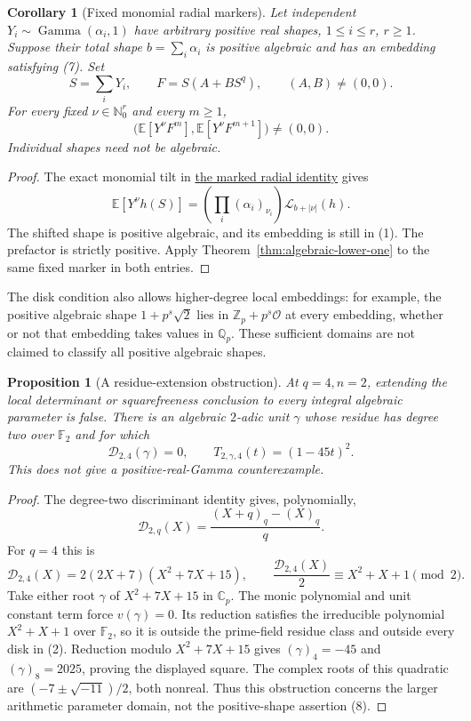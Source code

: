 \documentclass[11pt]{article}
\newtheorem{corollary}[lemma]{Corollary}
\newtheorem{proposition}[lemma]{Proposition}
\newcommand{\Cp}{\mathbb C_p}
\newcommand{\Zp}{\mathbb Z_p}
\newcommand{\OO}{\mathcal O}
\begin{document}
\begin{corollary}[Fixed monomial radial markers]\label{cor:algebraic-marked-radial}
Let independent $Y_i\sim\operatorname{Gamma}(\alpha_i,1)$ have
arbitrary positive real shapes, $1\le i\le r$, $r\ge1$.
Suppose their total shape $b=\sum_i\alpha_i$ is positive algebraic
and has an embedding satisfying (7).
Set
\[
 S=\sum_iY_i,\qquad F=S(A+BS^q),\qquad (A,B)\ne(0,0).
\]
For every fixed $\nu\in\mathbb N_0^r$ and every $m\ge1$,
\[
 \bigl(\mathbb E[Y^\nu F^m],\mathbb E[Y^\nu F^{m+1}]\bigr)\ne(0,0).
\]
Individual shapes need not be algebraic.
\end{corollary}
\begin{proof}
The exact monomial tilt in
\href{PRIME_POWER_MARKED_RADIAL_SFC.tex}{the marked radial identity}
gives
\[
 \mathbb E[Y^\nu h(S)]
  =\left(\prod_i(\alpha_i)_{\nu_i}\right)
           \mathcal L_{b+|\nu|}(h).
\]
The shifted shape is positive algebraic, and its embedding is still
in (1). The prefactor is strictly positive. Apply
Theorem~\ref{thm:algebraic-lower-one} to the same fixed marker in
both entries.
\end{proof}

The disk condition also allows higher-degree local embeddings:
for example, the positive algebraic shape $1+p^s\sqrt2$ lies in
$\Zp+p^s\OO$ at every embedding, whether or not that embedding
takes values in $\mathbb Q_p$. These sufficient domains are not
claimed to classify all positive algebraic shapes.

\begin{proposition}[A residue-extension obstruction]\label{prop:residue-extension-obstruction}
At $q=4,n=2$, extending the local determinant or squarefreeness
conclusion to every integral algebraic parameter is false.
There is an algebraic $2$-adic unit $\gamma$ whose residue has degree two
over $\mathbb F_2$ and for which
\[
 \mathcal D_{2,4}(\gamma)=0,\qquad
                 T_{2,\gamma,4}(t)=(1-45t)^2.
\]
This does not give a positive-real-Gamma counterexample.
\end{proposition}
\begin{proof}
The degree-two discriminant identity gives, polynomially,
\[
 \mathcal D_{2,q}(X)=\frac{(X+q)_q-(X)_q}{q}.
\]
For $q=4$ this is
\[
 \mathcal D_{2,4}(X)=2(2X+7)(X^2+7X+15),\qquad
 \frac{\mathcal D_{2,4}(X)}2\equiv X^2+X+1\pmod2.
 \tag{10}
\]
Take either root $\gamma$ of $X^2+7X+15$ in $\Cp$.
The monic polynomial and unit constant term force $v(\gamma)=0$.
Its reduction satisfies the irreducible polynomial
$X^2+X+1$ over $\mathbb F_2$, so it is outside the prime-field residue
class and outside every disk in (2).
Reduction modulo $X^2+7X+15$ gives
$(\gamma)_4=-45$ and $(\gamma)_8=2025$, proving the displayed square.
The complex roots of this quadratic are
$(-7\pm\sqrt{-11})/2$, both nonreal. Thus this obstruction concerns
the larger arithmetic parameter domain, not the positive-shape
assertion (8).
\end{proof}
\end{document}

